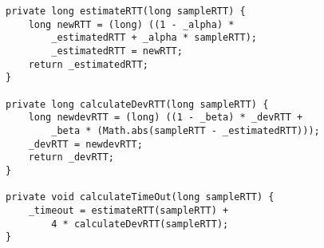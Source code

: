 \documentclass{llncs}
\begin{document}
\begin{lstlisting}
private long estimateRTT(long sampleRTT) {
	long newRTT = (long) ((1 - _alpha) * 
		_estimatedRTT + _alpha * sampleRTT);
		_estimatedRTT = newRTT;
	return _estimatedRTT;
}

private long calculateDevRTT(long sampleRTT) {
	long newdevRTT = (long) ((1 - _beta) * _devRTT + 
		_beta * (Math.abs(sampleRTT - _estimatedRTT)));
	_devRTT = newdevRTT;
	return _devRTT;
}

private void calculateTimeOut(long sampleRTT) {
	_timeout = estimateRTT(sampleRTT) + 
		4 * calculateDevRTT(sampleRTT);
}    
\end{lstlisting}


\end{document}
